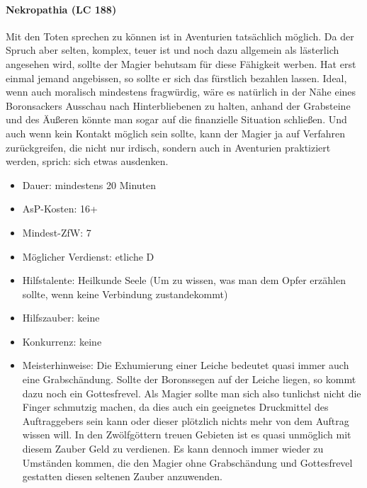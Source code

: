\paragraph{Nekropathia (LC 188)}
Mit den Toten sprechen zu können ist in Aventurien tatsächlich möglich. Da der Spruch aber selten, komplex, teuer ist und noch dazu allgemein als lästerlich angesehen wird, sollte der Magier behutsam für diese Fähigkeit werben. Hat erst einmal jemand angebissen, so sollte er sich das fürstlich bezahlen lassen. Ideal, wenn auch moralisch mindestens fragwürdig, wäre es natürlich in der Nähe eines Boronsackers Ausschau nach Hinterbliebenen zu halten, anhand der Grabsteine und des Äußeren könnte man sogar auf die finanzielle Situation schließen. Und auch wenn kein Kontakt möglich sein sollte, kann der Magier ja auf Verfahren zurückgreifen, die nicht nur irdisch, sondern auch in Aventurien praktiziert werden, sprich: sich etwas ausdenken.
\begin{itemize}
	\item Dauer: mindestens 20 Minuten
	\item AsP-Kosten: 16+
	\item Mindest-ZfW: 7
	\item Möglicher Verdienst: etliche D
	\item Hilfstalente: Heilkunde Seele (Um zu wissen, was man dem Opfer erzählen sollte, wenn keine Verbindung zustandekommt)
	\item Hilfszauber: keine
	\item Konkurrenz: keine
	\item Meisterhinweise: Die Exhumierung einer Leiche bedeutet quasi immer auch eine Grabschändung. Sollte der Boronssegen auf der Leiche liegen, so kommt dazu noch ein Gottesfrevel. Als Magier sollte man sich also tunlichst nicht die Finger schmutzig machen, da dies auch ein geeignetes Druckmittel des Auftraggebers sein kann oder dieser plötzlich nichts mehr von dem Auftrag wissen will. In den Zwölfgöttern treuen Gebieten ist es quasi unmöglich mit diesem Zauber Geld zu verdienen. Es kann dennoch immer wieder zu Umständen kommen, die den Magier ohne Grabschändung und Gottesfrevel gestatten diesen seltenen Zauber anzuwenden.
\end{itemize}

